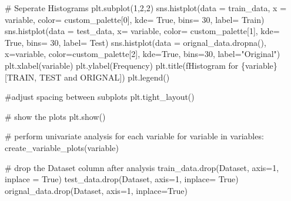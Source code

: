 \documentclass[
  letterpaper,
  DIV=11,
  numbers=noendperiod]{scrartcl}
\newenvironment{Shaded}{\begin{snugshade}}{\end{snugshade}}
\newcommand{\CommentTok}[1]{\textcolor[rgb]{0.37,0.37,0.37}{#1}}
\newcommand{\ControlFlowTok}[1]{\textcolor[rgb]{0.00,0.23,0.31}{#1}}
\newcommand{\DecValTok}[1]{\textcolor[rgb]{0.68,0.00,0.00}{#1}}
\newcommand{\KeywordTok}[1]{\textcolor[rgb]{0.00,0.23,0.31}{#1}}
\newcommand{\NormalTok}[1]{\textcolor[rgb]{0.00,0.23,0.31}{#1}}
\newcommand{\OperatorTok}[1]{\textcolor[rgb]{0.37,0.37,0.37}{#1}}
\newcommand{\SpecialCharTok}[1]{\textcolor[rgb]{0.37,0.37,0.37}{#1}}
\newcommand{\SpecialStringTok}[1]{\textcolor[rgb]{0.13,0.47,0.30}{#1}}
\newcommand{\StringTok}[1]{\textcolor[rgb]{0.13,0.47,0.30}{#1}}
\newcommand{\VariableTok}[1]{\textcolor[rgb]{0.07,0.07,0.07}{#1}}
\begin{document}
\begin{Shaded}
\begin{Highlighting}[]
    \CommentTok{\# Seperate Histograms}
\NormalTok{    plt.subplot(}\DecValTok{1}\NormalTok{,}\DecValTok{2}\NormalTok{,}\DecValTok{2}\NormalTok{)}
\NormalTok{    sns.histplot(data }\OperatorTok{=}\NormalTok{ train\_data, x }\OperatorTok{=}\NormalTok{ variable, color}\OperatorTok{=}\NormalTok{ custom\_palette[}\DecValTok{0}\NormalTok{], kde}\OperatorTok{=} \VariableTok{True}\NormalTok{, bins}\OperatorTok{=} \DecValTok{30}\NormalTok{, label}\OperatorTok{=} \StringTok{\textquotesingle{}Train\textquotesingle{}}\NormalTok{)}
\NormalTok{    sns.histplot(data }\OperatorTok{=}\NormalTok{ test\_data, x}\OperatorTok{=}\NormalTok{ variable, color}\OperatorTok{=}\NormalTok{ custom\_palette[}\DecValTok{1}\NormalTok{], kde}\OperatorTok{=} \VariableTok{True}\NormalTok{, bins}\OperatorTok{=} \DecValTok{30}\NormalTok{, label}\OperatorTok{=} \StringTok{\textquotesingle{}Test\textquotesingle{}}\NormalTok{)}
\NormalTok{    sns.histplot(data }\OperatorTok{=}\NormalTok{ orignal\_data.dropna(), x}\OperatorTok{=}\NormalTok{variable, color}\OperatorTok{=}\NormalTok{custom\_palette[}\DecValTok{2}\NormalTok{], kde}\OperatorTok{=}\VariableTok{True}\NormalTok{, bins}\OperatorTok{=}\DecValTok{30}\NormalTok{, label}\OperatorTok{=}\StringTok{"Original"}\NormalTok{)}
\NormalTok{    plt.xlabel(variable)}
\NormalTok{    plt.ylabel(}\StringTok{\textquotesingle{}Frequency\textquotesingle{}}\NormalTok{)}
\NormalTok{    plt.title(}\SpecialStringTok{f\textquotesingle{}Histogram for }\SpecialCharTok{\{}\NormalTok{variable}\SpecialCharTok{\}}\SpecialStringTok{ [TRAIN, TEST and ORIGNAL]\textquotesingle{}}\NormalTok{)}
\NormalTok{    plt.legend()}
    
    \CommentTok{\#adjust spacing between subplots}
\NormalTok{    plt.tight\_layout()}
    
    \CommentTok{\# show the plots}
\NormalTok{    plt.show()}

\CommentTok{\# perform univariate analysis for each variable}
\ControlFlowTok{for}\NormalTok{ variable }\KeywordTok{in}\NormalTok{ variables:}
\NormalTok{    create\_variable\_plots(variable)}
    
\CommentTok{\# drop the \textquotesingle{}Dataset\textquotesingle{} column after analysis}
\NormalTok{train\_data.drop(}\StringTok{\textquotesingle{}Dataset\textquotesingle{}}\NormalTok{, axis}\OperatorTok{=}\DecValTok{1}\NormalTok{, inplace }\OperatorTok{=} \VariableTok{True}\NormalTok{)}
\NormalTok{test\_data.drop(}\StringTok{\textquotesingle{}Dataset\textquotesingle{}}\NormalTok{, axis}\OperatorTok{=}\DecValTok{1}\NormalTok{, inplace}\OperatorTok{=} \VariableTok{True}\NormalTok{)}
\NormalTok{orignal\_data.drop(}\StringTok{\textquotesingle{}Dataset\textquotesingle{}}\NormalTok{, axis}\OperatorTok{=}\DecValTok{1}\NormalTok{, inplace}\OperatorTok{=}\VariableTok{True}\NormalTok{)}
\end{Highlighting}
\end{Shaded}
\end{document}

